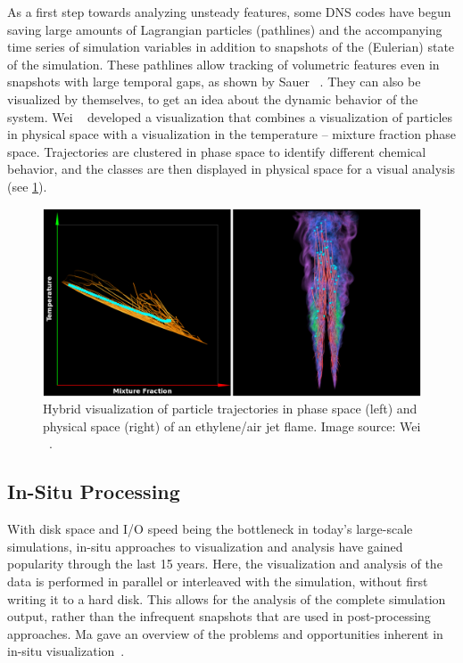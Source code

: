 %
As a first step towards analyzing unsteady features, some \ac{DNS} codes have
begun saving large amounts of Lagrangian particles (pathlines) and the
accompanying time series of simulation variables in addition to snapshots of the
(Eulerian) state of the simulation.
%
These pathlines allow tracking of volumetric features even in snapshots with
large temporal gaps, as shown by Sauer \etal{}~\cite{Sauer2014}.
%
They can also be visualized by themselves, to get an idea about the dynamic
behavior of the system.
%
Wei \etal{}~\cite{Wei2011} developed a visualization that combines a visualization
of particles in physical space with a visualization in the temperature --
mixture fraction phase space.
%
Trajectories are clustered in phase space to identify different chemical
behavior, and the classes are then displayed in physical space for a visual
analysis (see \cref{fig:wei_particle_clusters}).
%
\begin{figure}[t]
    \centering
    \includegraphics[width=\textwidth]{figures/wei_particle_clusters.png}
    \caption{Hybrid visualization of particle trajectories in phase space (left)
    and physical space (right) of an ethylene/air jet flame. Image source:
    Wei \etal{}~\cite{Wei2011}.}
    \label{fig:wei_particle_clusters}
\end{figure}
%
%
%
\subsection{In-Situ Processing} %
\label{sub:in_situ_processing}
%
With disk space and I/O speed being the bottleneck in today's large-scale
simulations, in-situ approaches to visualization and analysis have gained
popularity through the last 15 years.
%
Here, the visualization and analysis of the data is performed in parallel or
interleaved with the simulation, without first writing it to a hard disk.
%
This allows for the analysis of the complete simulation output, rather than
the infrequent snapshots that are used in post-processing approaches.
%
Ma gave an overview of the problems and opportunities inherent in in-situ
visualization~\cite{Ma2009}.
%

